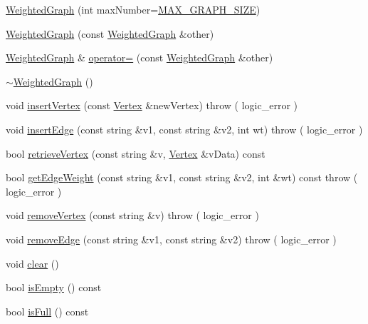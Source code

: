 \begin{DoxyCompactItemize}
\item 
\hyperlink{class_weighted_graph_a9255d382e53db8d520ef1e2b63814c81}{Weighted\-Graph} (int max\-Number=\hyperlink{class_weighted_graph_af9b34017e5b494cd3aca2dbc8335fc3c}{M\-A\-X\-\_\-\-G\-R\-A\-P\-H\-\_\-\-S\-I\-Z\-E})
\item 
\hyperlink{class_weighted_graph_a294fd717db213e761dc0eb65bbfcb7ab}{Weighted\-Graph} (const \hyperlink{class_weighted_graph}{Weighted\-Graph} \&other)
\item 
\hyperlink{class_weighted_graph}{Weighted\-Graph} \& \hyperlink{class_weighted_graph_aa5982a507e944af28e4749cdc06543c6}{operator=} (const \hyperlink{class_weighted_graph}{Weighted\-Graph} \&other)
\item 
\hyperlink{class_weighted_graph_ad7b4a5c8206772f9f4fb5906c0d64923}{$\sim$\-Weighted\-Graph} ()
\item 
void \hyperlink{class_weighted_graph_aec4ef3455e3cc0d73a42e042adb7ac40}{insert\-Vertex} (const \hyperlink{class_weighted_graph_1_1_vertex}{Vertex} \&new\-Vertex)  throw ( logic\-\_\-error )
\item 
void \hyperlink{class_weighted_graph_a6f59ad223d921324c3ec629d0d6e4eea}{insert\-Edge} (const string \&v1, const string \&v2, int wt)  throw ( logic\-\_\-error )
\item 
bool \hyperlink{class_weighted_graph_a3afabc2236c99dac950f5161f715f114}{retrieve\-Vertex} (const string \&v, \hyperlink{class_weighted_graph_1_1_vertex}{Vertex} \&v\-Data) const 
\item 
bool \hyperlink{class_weighted_graph_ab136044e7378313087be69eb43e7f042}{get\-Edge\-Weight} (const string \&v1, const string \&v2, int \&wt) const   throw ( logic\-\_\-error )
\item 
void \hyperlink{class_weighted_graph_abaaa572a9b1a60ec3cd99d8db9d9590e}{remove\-Vertex} (const string \&v)  throw ( logic\-\_\-error )
\item 
void \hyperlink{class_weighted_graph_a1db455249fa7fedf70aa5683487a17df}{remove\-Edge} (const string \&v1, const string \&v2)  throw ( logic\-\_\-error )
\item 
void \hyperlink{class_weighted_graph_a26890ebf74d23821a6e4dbcf803b5002}{clear} ()
\item 
bool \hyperlink{class_weighted_graph_a1c03a0f68447cf88fed97c2076501702}{is\-Empty} () const 
\item 
bool \hyperlink{class_weighted_graph_a22e56836e3967031a657cfa9ea5b9843}{is\-Full} () const 
\item 

\end{DoxyCompactItemize}
